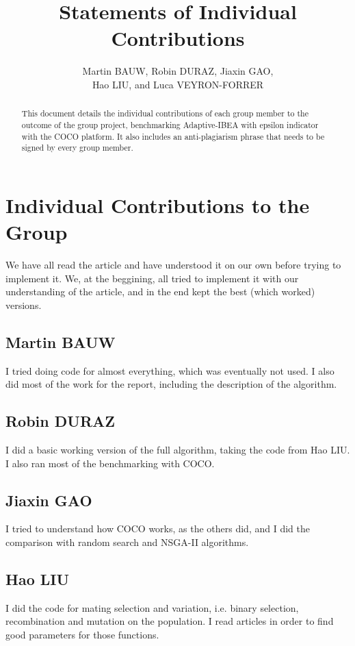 \documentclass{article}
\begin{document}
\title{Statements of Individual Contributions}

\author{Martin BAUW, Robin DURAZ, Jiaxin GAO,\\ Hao LIU, and Luca VEYRON-FORRER}
\maketitle
\begin{abstract}
This document details the individual contributions of each group member to the outcome of the group project, benchmarking Adaptive-IBEA with epsilon indicator with the COCO platform. It also includes an anti-plagiarism phrase that needs to be signed by every group member.
\end{abstract}


\section{Individual Contributions to the Group}
We have all read the article and have understood it on our own before trying to
implement it. We, at the beggining, all tried to implement it with our
understanding of the article, and in the end kept the best (which worked) versions.

\subsection{Martin BAUW}
I tried doing code for almost everything, which was eventually not used. I also
did most of the work for the report, including the description of the algorithm.

\subsection{Robin DURAZ}
I did a basic working version of the full algorithm, taking the code from Hao
LIU. I also ran most of the benchmarking with COCO.

\subsection{Jiaxin GAO}
I tried to understand how COCO works, as the others did, and I did the
comparison with random search and NSGA-II algorithms. 

\subsection{Hao LIU}
I did the code for mating selection and variation, i.e. binary selection,
recombination and mutation on the population. I read articles in order to find
good parameters for those functions.
\end{document}
